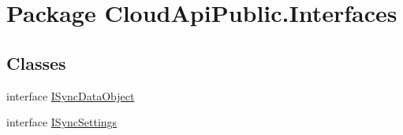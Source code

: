 \hypertarget{namespace_cloud_api_public_1_1_interfaces}{\section{Package Cloud\-Api\-Public.\-Interfaces}
\label{namespace_cloud_api_public_1_1_interfaces}
}
\subsection*{Classes}
\begin{DoxyCompactItemize}
\item 
interface \hyperlink{interface_cloud_api_public_1_1_interfaces_1_1_i_sync_data_object}{I\-Sync\-Data\-Object}
\item 
interface \hyperlink{interface_cloud_api_public_1_1_interfaces_1_1_i_sync_settings}{I\-Sync\-Settings}
\end{DoxyCompactItemize}
